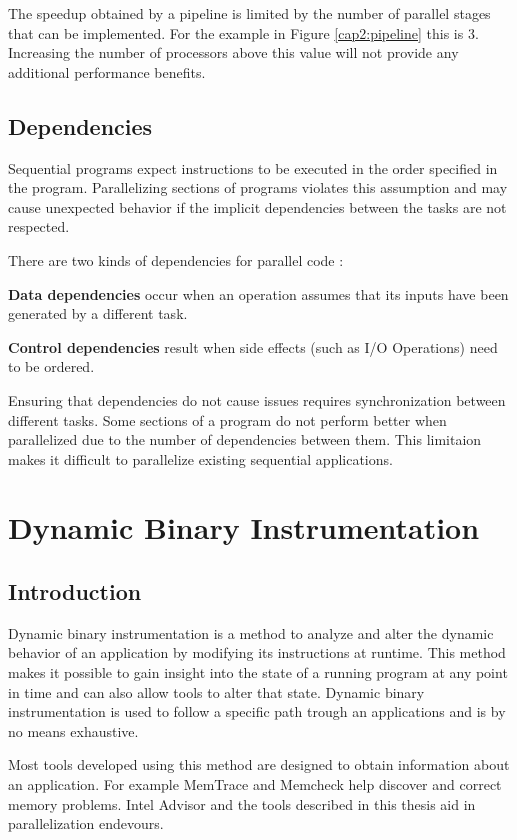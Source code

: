 The speedup obtained by a pipeline is limited by the number of parallel stages that can be implemented. For the example in Figure \ref{cap2:pipeline} this is 3. Increasing the number of processors above this value will not provide any additional performance benefits.

\subsection{Dependencies}

Sequential programs expect instructions to be executed in the order specified in the program. Parallelizing sections of programs violates this assumption and may cause unexpected behavior if the implicit dependencies between the tasks are not respected.

There are two kinds of dependencies for parallel code \cite{parbook}:

\textbf{Data dependencies} occur when an operation assumes that its inputs have been generated by a different task.

\textbf{Control dependencies} result when side effects (such as I/O Operations) need to be ordered.

Ensuring that dependencies do not cause issues requires synchronization between different tasks. Some sections of a program do not perform better when parallelized due to the number of dependencies between them. This limitaion makes it difficult to parallelize existing sequential applications.

\section {Dynamic Binary Instrumentation}

\subsection{Introduction}

Dynamic binary instrumentation is a method to analyze and alter the dynamic behavior of an application by modifying its instructions at runtime. This method makes it possible to gain insight into the state of a running program at any point in time and can also allow tools to alter that state. Dynamic binary instrumentation is used to follow a specific path trough an applications and is by no means exhaustive.

Most tools developed using this method are designed to obtain information about an application. For example MemTrace \cite{pindoc} and Memcheck \cite{memcheck} help discover and correct memory problems. Intel Advisor \cite{inteladvisor} and the tools described in this thesis aid in parallelization endevours.

